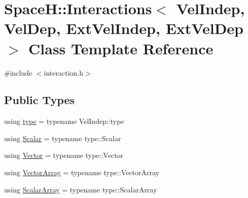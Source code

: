\hypertarget{class_space_h_1_1_interactions}{}\section{SpaceH\+:\+:Interactions$<$ Vel\+Indep, Vel\+Dep, Ext\+Vel\+Indep, Ext\+Vel\+Dep $>$ Class Template Reference}
\label{class_space_h_1_1_interactions}


{\ttfamily \#include $<$interaction.\+h$>$}

\subsection*{Public Types}
\begin{DoxyCompactItemize}
\item 
using \mbox{\hyperlink{class_space_h_1_1_interactions_aa45fc9367bfa0b8693700525ffa2655f}{type}} = typename Vel\+Indep\+::type
\item 
using \mbox{\hyperlink{class_space_h_1_1_interactions_a75aa1c0790d493ec5c64bb13087b8125}{Scalar}} = typename type\+::\+Scalar
\item 
using \mbox{\hyperlink{class_space_h_1_1_interactions_aaebe228fb44635e85cdb8cc9c10d30d1}{Vector}} = typename type\+::\+Vector
\item 
using \mbox{\hyperlink{class_space_h_1_1_interactions_ac9d9b24b469c4be73b96ce0f09f93fcf}{Vector\+Array}} = typename type\+::\+Vector\+Array
\item 
using \mbox{\hyperlink{class_space_h_1_1_interactions_ad883cb84fcf3379499fade542310632e}{Scalar\+Array}} = typename type\+::\+Scalar\+Array
\end{DoxyCompactItemize}
